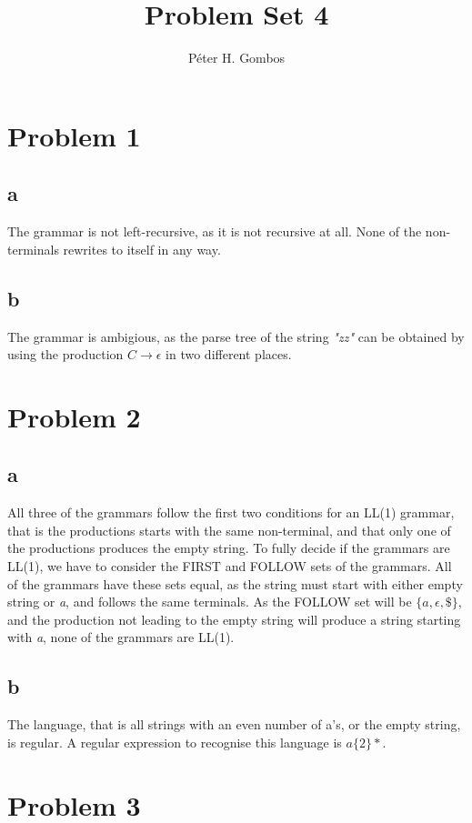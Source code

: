 \documentclass{article}
\title{Problem Set 4}
\author{Péter H. Gombos}
\begin{document}
\maketitle
\section*{Problem 1}
\subsection*{a}
The grammar is not left-recursive, as it is not recursive at all. None of the
non-terminals rewrites to itself in any way.

\subsection*{b}
The grammar is ambigious, as the parse tree of the string \emph{"zz"} can be
obtained by using the production $C \rightarrow \epsilon$ in two different
places.

\section*{Problem 2}
\subsection*{a}
All three of the grammars follow the first two conditions for an LL(1) grammar,
that is the productions starts with the same non-terminal, and that only one of
the productions produces the empty string. To fully decide if the grammars are
LL(1), we have to consider the FIRST and FOLLOW sets of the grammars. All of
the grammars have these sets equal, as the string must start with either empty
string or \emph{a}, and follows the same terminals. As the FOLLOW set will be
$\{a, \epsilon, \$\}$, and the production not leading to the empty string will
produce a string starting with \emph{a}, none of the grammars are LL(1).

\subsection*{b}
The language, that is all strings with an even number of a's, or the empty
string, is regular. A regular expression to recognise this language is $a\{2\}*$.

\section*{Problem 3}
\end{document}
